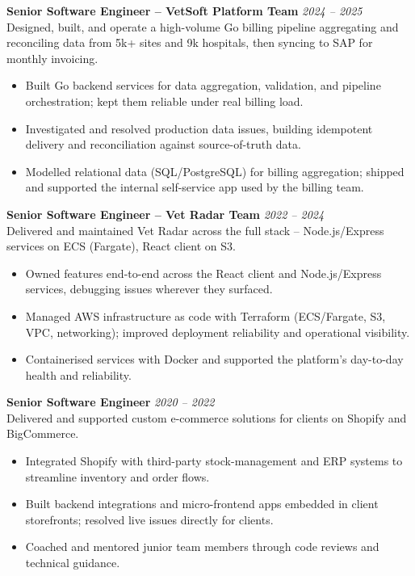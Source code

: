 \documentclass{resume}
\begin{document}
\vspace{1em}

\textbf{Senior Software Engineer -- VetSoft Platform Team} \hfill \textit{2024 -- 2025} \\
Designed, built, and operate a high-volume Go billing pipeline aggregating and reconciling data from 5k+ sites and 9k hospitals, then syncing to SAP for monthly invoicing.
\begin{itemize}
  \item Built Go backend services for data aggregation, validation, and pipeline orchestration; kept them reliable under real billing load.
  \item Investigated and resolved production data issues, building idempotent delivery and reconciliation against source-of-truth data.
  \item Modelled relational data (SQL/PostgreSQL) for billing aggregation; shipped and supported the internal self-service app used by the billing team.
\end{itemize}

\vspace{1em}

\textbf{Senior Software Engineer -- Vet Radar Team} \hfill \textit{2022 -- 2024} \\
Delivered and maintained Vet Radar across the full stack -- Node.js/Express services on ECS (Fargate), React client on S3.
\begin{itemize}
  \item Owned features end-to-end across the React client and Node.js/Express services, debugging issues wherever they surfaced.
  \item Managed AWS infrastructure as code with Terraform (ECS/Fargate, S3, VPC, networking); improved deployment reliability and operational visibility.
  \item Containerised services with Docker and supported the platform's day-to-day health and reliability.
\end{itemize}

\vspace{1em}

\vspace{1em}
\textbf{Senior Software Engineer} \hfill \textit{2020 -- 2022} \\
Delivered and supported custom e-commerce solutions for clients on Shopify and BigCommerce.
\begin{itemize}
  \item Integrated Shopify with third-party stock-management and ERP systems to streamline inventory and order flows.
  \item Built backend integrations and micro-frontend apps embedded in client storefronts; resolved live issues directly for clients.
  \item Coached and mentored junior team members through code reviews and technical guidance.
\end{itemize}
\end{document}
